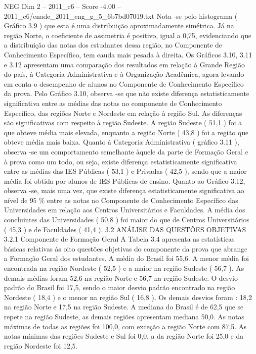 \begin{textsample}{NEG Dim 2 – 2011\_c6 – Score -4.00 – 2011\_c6/enade\_2011\_eng\_g\_5\_6b7bd07019.txt}
Nota -se pelo histograma ( Gráfico 3.9 ) que esta é uma distribuição aproximadamente simétrica.
Já na região Norte, o coeficiente de assimetria é positivo, igual a 0,75, evidenciando que a distribuição das notas dos estudantes dessa região, no Componente de Conhecimento Específico, tem cauda mais pesada à direita.
Os Gráficos 3.10, 3.11 e 3.12 apresentam uma comparação dos resultados em relação à Grande Região do país, à Categoria Administrativa e à Organização Acadêmica, agora levando em conta o desempenho de alunos no Componente de Conhecimento Específico da prova.
Pelo Gráfico 3.10, observa -se que não existe diferença estatisticamente significativa entre as médias das notas no componente de Conhecimento Específico, das regiões Norte e Nordeste em relação à região Sul.
As diferenças são significativas com respeito à região Sudeste.
A região Sudeste ( 51,1 ) foi a que obteve média mais elevada, enquanto a região Norte ( 43,8 ) foi a região que obteve média mais baixa.
Quanto à Categoria Administrativa ( gráfico 3.11 ), observa -se um comportamento semelhante àquele da parte de Formação Geral e à prova como um todo, ou seja, existe diferença estatisticamente significativa entre as médias das IES Públicas ( 53,1 ) e Privadas ( 42,5 ), sendo que a maior média foi obtida por alunos de IES Públicas de ensino.
Quanto ao Gráfico 3.12, observa -se, mais uma vez, que existe diferença estatisticamente significativa ao nível de 95 \% entre as notas no Componente de Conhecimento Específico das Universidades em relação aos Centros Universitários e Faculdades.
A média dos concluintes das Universidades ( 50,8 ) foi maior do que de Centros Universitários ( 45,3 ) e de Faculdades ( 41,4 ). 3.2 ANÁLISE DAS QUESTÕES OBJETIVAS 3.2.1 Componente de Formação Geral A Tabela 3.4 apresenta as estatísticas básicas relativas às oito questões objetivas do componente da prova que abrange a Formação Geral dos estudantes.
A média do Brasil foi 55,6.
A menor média foi encontrada na região Nordeste ( 52,5 ) e a maior na região Sudeste ( 56,7 ).
As demais médias foram 52,6 na região Norte e 56,7 na região Sudeste.
O desvio padrão do Brasil foi 17,5, sendo o maior desvio padrão encontrado na região Nordeste ( 18,4 ) e o menor na região Sul ( 16,8 ).
Os demais desvios foram : 18,2 na região Norte e 17,5 na região Sudeste.
A mediana do Brasil é de 62,5 que se repete na região Sudeste, as demais regiões apresentam mediana 50,0.
As notas máximas de todas as regiões foi 100,0, com exceção a região Norte com 87,5.
As notas mínimas das regiões Sudeste e Sul foi 0,0, a da região Norte foi 25,0 e da região Nordeste foi 12,5.

\end{textsample}
